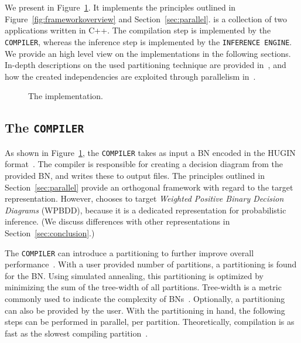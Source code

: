 \section{\toolname}
\label{sec:tool}\label{sec:implementation}

We present \toolname in Figure~\ref{fig:implementation}. It implements the principles outlined in Figure~\ref{fig:frameworkoverview} and Section~\ref{sec:parallel}. \toolname is a collection of two applications written in C++. The compilation step is implemented by the \verb+COMPILER+, whereas the inference step is implemented by the \verb+INFERENCE ENGINE+. We provide an high level view on the implementations in the following sections.
In-depth descriptions on the used partitioning technique are provided in~\cite{dal2017reducing,dal2021compositional}, and how the created independencies are exploited through parallelism in~\cite{dal2018parallel}.

\begin{figure}[!t]
    \centering
    
    \caption{The implementation.}
    \label{fig:implementation}
\end{figure}

\subsection{The \texttt{COMPILER}}

As shown in Figure~\ref{fig:implementation}, the \verb+COMPILER+ takes as input a BN encoded in the HUGIN format~\cite{madsen2003hugin}. The compiler is responsible for creating a decision diagram from the provided BN, and writes these to output files. The principles outlined in Section~\ref{sec:parallel} provide an orthogonal framework with regard to the target representation. However, \toolname chooses to target \emph{Weighted Positive Binary Decision Diagrams} (WPBDD), because it is a dedicated representation for probabilistic inference. (We discuss differences with other representations in Section~\ref{sec:conclusion}.)

The \texttt{COMPILER} can introduce a partitioning to further improve overall performance~\cite{dal2017reducing}. With a user provided number of partitions, a partitioning is found for the BN. Using simulated annealing, this partitioning is optimized by minimizing the sum of the  tree-width of all partitions. Tree-width is a metric commonly used to indicate the complexity of BNs~\cite{bollig2014width}. Optionally, a partitioning can also be provided by the user. With the partitioning in hand, the following steps can be performed in parallel, per partition. Theoretically, compilation is as fast as the slowest compiling partition~\cite{dal2018parallel}.


